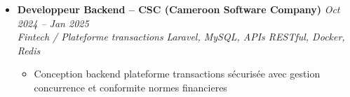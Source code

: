 \documentclass[a4paper,11pt]{article}
\begin{document}
\begin{itemize}[leftmargin=*, label={-}]
\item \textbf{Developpeur Backend -- CSC (Cameroon Software Company)} \hfill \textit{Oct 2024 -- Jan 2025} \\
\textit{Fintech / Plateforme transactions} \hfill \textit{Laravel, MySQL, APIs RESTful, Docker, Redis}
\vspace{-2pt}
    \begin{itemize}[leftmargin=0.4cm, nosep, label=\tiny$\bullet$]
        \item \small{Conception backend plateforme transactions sécurisée avec gestion concurrence et conformite normes financieres}
    \end{itemize}

\end{itemize}
\end{document}
